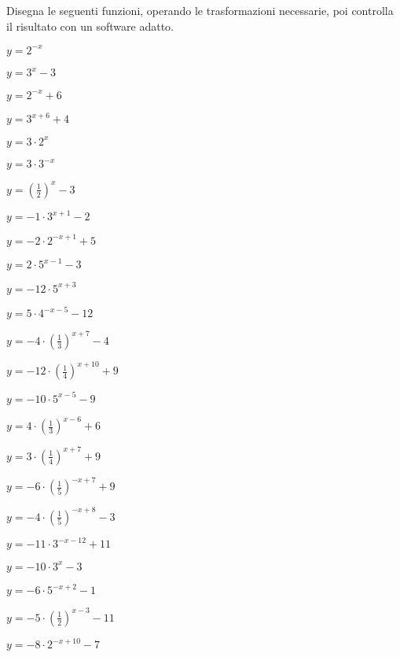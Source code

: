 \begin{esercizio}\label{ese:}
 Disegna le seguenti funzioni, operando le trasformazioni necessarie, poi 
controlla il risultato con un software adatto.
\begin{multicols}{3}
 \begin{enumeratea}
  \item  \(y= 2^{-x}\)
  \item  \(y= 3^{x} -3\)
  \item  \(y= 2^{-x} +6\)
  \item  \(y= 3^{x+6} +4\)
  \item  \(y= 3 \cdot 2^{x}\)
  \item  \(y= 3 \cdot 3^{-x}\)
  \item  \(y= \left(\frac{1}{2}\right)^{x} -3\)
  \item  \(y= -1 \cdot 3^{x+1} -2\)
  \item  \(y= -2 \cdot 2^{-x+1} +5\)
  \item  \(y= 2 \cdot 5^{x-1} -3\)
  \item  \(y=-12 \cdot 5^{x+3} \)
  \item  \(y=5 \cdot 4^{-x-5} -12\)
  \item  \(y=-4 \cdot \left(\frac{1}{3}\right)^{x+7} -4\)
  \item  \(y=-12 \cdot \left(\frac{1}{4}\right)^{x+10} +9\)
  \item  \(y=-10 \cdot 5^{x-5} -9\)
  \item  \(y=4 \cdot \left(\frac{1}{3}\right)^{x-6} +6\)
  \item  \(y=3 \cdot \left(\frac{1}{4}\right)^{x+7} +9\)
  \item  \(y=-6 \cdot \left(\frac{1}{5}\right)^{-x+7} +9\)
  \item  \(y=-4 \cdot \left(\frac{1}{5}\right)^{-x+8} -3\)
  \item  \(y=-11 \cdot 3^{-x-12} +11\)
  \item  \(y=-10 \cdot 3^{x } -3\)
  \item  \(y=-6 \cdot 5^{-x+2} -1\)
  \item  \(y=-5 \cdot \left(\frac{1}{2}\right)^{x-3} -11\)
  \item  \(y=-8 \cdot 2^{-x+10} -7\)
 \end{enumeratea}
 \end{multicols}
\end{esercizio}



